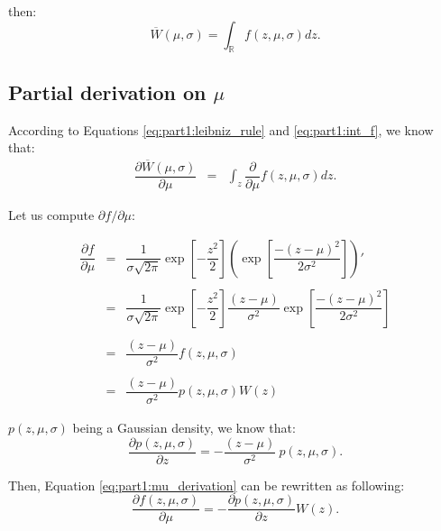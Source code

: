 then:
\begin{equation}
\overline{W}(\mu,\sigma) = \displaystyle\int_{\mathbb{R}} f(z,\mu,\sigma)dz.
\label{eq:part1:int_f}
\end{equation}


\subsection*{Partial derivation on $\mu$}

According to Equations \ref{eq:part1:leibniz_rule} and \ref{eq:part1:int_f}, we know that:
\begin{equation}
\begin{array}{rcl}
\dfrac{\partial \overline{W}(\mu,\sigma)}{\partial \mu} & = & \displaystyle\int_z \dfrac{\partial}{\partial \mu} f(z,\mu,\sigma) dz.
\end{array}
\end{equation}

Let us compute $\partial f / \partial \mu$:

\begin{equation}
\begin{array}{rcl}
\dfrac{\partial f}{\partial \mu} & = & \dfrac{1}{\sigma \sqrt{2\pi}} \exp \left[ -\dfrac{z^2}{2} \right] \left(\exp \left[ \dfrac{-(z-\mu)^2}{2\sigma^2} \right] \right)'\\\\
& = & \dfrac{1}{\sigma \sqrt{2\pi}} \exp \left[ -\dfrac{z^2}{2} \right] \dfrac{(z-\mu)}{\sigma^2} \exp \left[ \dfrac{-(z-\mu)^2}{2\sigma^2} \right]\\\\
& = & \dfrac{(z-\mu)}{\sigma^2} f(z,\mu,\sigma)\\\\
& = & \dfrac{(z-\mu)}{\sigma^2} p(z,\mu,\sigma)W(z)
\end{array}
\label{eq:part1:mu_derivation}
\end{equation}

$p(z,\mu,\sigma)$ being a Gaussian density, we know that:
\begin{equation}
\dfrac{\partial p(z,\mu,\sigma)}{\partial z} = -\dfrac{(z-\mu)}{\sigma^2}\ p(z,\mu,\sigma).
\end{equation}

Then, Equation \ref{eq:part1:mu_derivation} can be rewritten as following:
\begin{equation}
\dfrac{\partial f(z,\mu,\sigma)}{\partial \mu} = -\dfrac{\partial p(z,\mu,\sigma)}{\partial z}W(z).
\end{equation}

